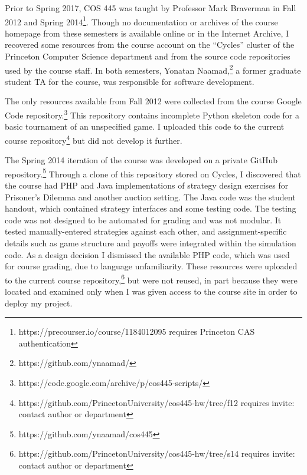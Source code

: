 \documentclass[pageno]{jpaper}
\begin{document}
Prior to Spring 2017, COS 445 was taught by Professor Mark Braverman in Fall 2012 and Spring 2014\footnote{https://precourser.io/course/1184012095 requires Princeton CAS authentication}.
Though no documentation or archives of the course homepage from these semesters is available online or in the Internet Archive, I recovered some resources from the course account on the ``Cycles'' cluster of the Princeton Computer Science department and from the source code repositories used by the course staff.
In both semesters, Yonatan Naamad,\footnote{https://github.com/ynaamad/} a former graduate student TA for the course, was responsible for software development.

The only resources available from Fall 2012 were collected from the course Google Code repository.\footnote{https://code.google.com/archive/p/cos445-scripts/}
This repository contains incomplete Python skeleton code for a basic tournament of an unspecified game.
I uploaded this code to the current course repository\footnote{https://github.com/PrincetonUniversity/cos445-hw/tree/f12 requires invite: contact author or department} but did not develop it further.

The Spring 2014 iteration of the course was developed on a private GitHub repository.\footnote{https://github.com/ynaamad/cos445}
Through a clone of this repository stored on Cycles, I discovered that the course had PHP and Java implementations of strategy design exercises for Prisoner's Dilemma and another auction setting.
The Java code was the student handout, which contained strategy interfaces and some testing code.
The testing code was not designed to be automated for grading and was not modular.
It tested manually-entered strategies against each other, and assignment-specific details such as game structure and payoffs were integrated within the simulation code.
As a design decision I dismissed the available PHP code, which was used for course grading, due to language unfamiliarity.
These resources were uploaded to the current course repository,\footnote{https://github.com/PrincetonUniversity/cos445-hw/tree/s14 requires invite: contact author or department} but were not reused, in part because they were located and examined only when I was given access to the course site in order to deploy my project.
\end{document}

